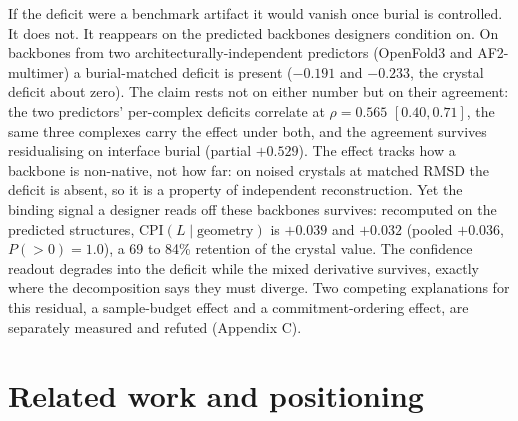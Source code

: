 \documentclass{article} %
\begin{document}
If the deficit were a benchmark artifact it would vanish once burial is controlled. It does not. It reappears on
the predicted backbones designers condition on. On backbones from two architecturally-independent predictors
(OpenFold3 and AF2-multimer) a burial-matched deficit is present ($-0.191$ and $-0.233$, the crystal deficit about
zero). The claim rests not on either number but on their agreement: the two predictors' per-complex deficits
correlate at $\rho = 0.565$ $[0.40, 0.71]$, the same three complexes carry the effect under both, and the agreement
survives residualising on interface burial (partial $+0.529$). The effect tracks how a backbone is non-native, not
how far: on noised crystals at matched RMSD the deficit is absent, so it is a property of independent
reconstruction. Yet the binding signal a designer reads off these backbones survives: recomputed on the predicted
structures, CPI$(L \mid \text{geometry})$ is $+0.039$ and $+0.032$ (pooled $+0.036$, $P(>0)=1.0$), a 69 to 84\%
retention of the crystal value. The confidence readout degrades into the deficit while the mixed derivative survives,
exactly where the decomposition says they must diverge. Two competing explanations for this residual, a
sample-budget effect and a commitment-ordering effect, are separately measured and refuted (Appendix C).


\section{Related work and positioning}
\end{document}
